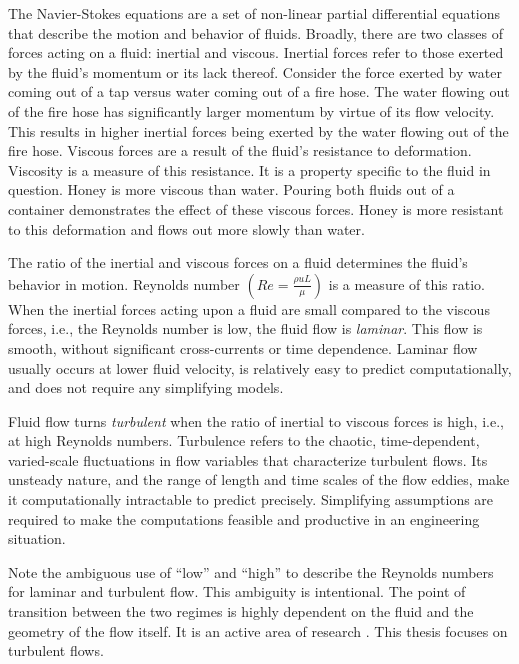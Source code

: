 The Navier-Stokes equations are a set of non-linear partial differential equations that describe the motion and behavior of fluids.
Broadly, there are two classes of forces acting on a fluid: inertial and viscous.
Inertial forces refer to those exerted by the fluid's momentum or its lack thereof.
Consider the force exerted by water coming out of a tap versus water coming out of a fire hose.
The water flowing out of the fire hose has significantly larger momentum by virtue of its flow velocity.
This results in higher inertial forces being exerted by the water flowing out of the fire hose.
Viscous forces are a result of the fluid's resistance to deformation.
Viscosity is a measure of this resistance.
It is a property specific to the fluid in question.
Honey is more viscous than water.
Pouring both fluids out of a container demonstrates the effect of these viscous forces.
Honey is more resistant to this deformation and flows out more slowly than water.

The ratio of the inertial and viscous forces on a fluid determines the fluid's behavior in motion.
Reynolds number $\left ( Re = \frac{\rho u L}{\mu}\right )$ is a measure of this ratio. When the inertial forces acting upon a fluid are small compared to the viscous forces, i.e., the Reynolds number is low, the fluid flow is  \textit{laminar}.
This flow is smooth, without significant cross-currents or time dependence.
Laminar flow usually occurs at lower fluid velocity, is relatively easy to predict computationally, and does not require any simplifying models.

Fluid flow turns \textit{turbulent} when the ratio of inertial to viscous forces is high, i.e., at high Reynolds numbers.
Turbulence refers to the chaotic, time-dependent, varied-scale fluctuations in flow variables that characterize turbulent flows.
Its unsteady nature, and the range of length and time scales of the flow eddies, make it computationally intractable to predict precisely.
Simplifying assumptions are required to make the computations feasible and productive in an engineering situation. 

Note the ambiguous use of ``low'' and ``high'' to describe the Reynolds numbers for laminar and turbulent flow.
This ambiguity is intentional.
The point of transition between the two regimes is highly dependent on the fluid and the geometry of the flow itself.
It is an active area of research \cite{arnal2000laminar}.
This thesis focuses on turbulent flows. 